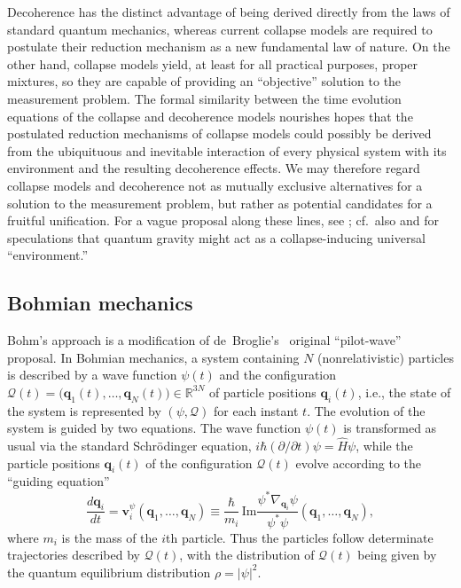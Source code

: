 \documentclass[rmp,aps,amsmath,amsfonts,noshowkeys,noshowpacs,12pt]{revtex4}
\newcommand{\cf}{cf.\ }
\begin{document}
Decoherence has the distinct advantage of being derived directly from
the laws of standard quantum mechanics, whereas current collapse
models are required to postulate their reduction mechanism as a new
fundamental law of nature. On the other hand, collapse models yield,
at least for all practical purposes, proper mixtures, so they are
capable of providing an ``objective'' solution to the measurement
problem. The formal similarity between the time evolution equations of
the collapse and decoherence models nourishes hopes that the
postulated reduction mechanisms of collapse models could possibly be
derived from the ubiquituous and inevitable interaction of every
physical system with its environment and the resulting decoherence
effects. We may therefore regard collapse models and decoherence not
as mutually exclusive alternatives for a solution to the measurement
problem, but rather as potential candidates for a fruitful
unification. For a vague proposal along these lines, see
\citet{Pessoa:1998:yl}; \cf also \citet{Diosi:1989:yb} and
\citet{Pearle:1999:cr} for speculations that quantum gravity might act
as a collapse-inducing universal ``environment.''


\subsection{Bohmian mechanics}

Bohm's approach \citep{Bohm:1952:rc,Bohm:1966:ps,Bohm:1993:ll} is a
modification of de~Broglie's~\citeyearpar{DeBroglie:1930:yt} original
``pilot-wave'' proposal. In Bohmian mechanics, a system containing $N$
(nonrelativistic) particles is described by a wave function $\psi(t)$
and the configuration $\mathcal{Q}(t)=\bigl(\mathbf{q}_1(t), \hdots,
\mathbf{q}_N(t)\bigr) \in \mathbb{R}^{3N}$ of particle positions
$\mathbf{q}_i(t)$, i.e., the state of the system is represented by
$(\psi, \mathcal{Q})$ for each instant $t$. The evolution of the
system is guided by two equations. The wave function $\psi(t)$
is transformed as usual via the standard Schr\"odinger equation, $i
\hbar (\partial / \partial t) \psi = \widehat{H}\psi$, while the
particle positions $\mathbf{q}_i(t)$ of the configuration
$\mathcal{Q}(t)$ evolve according to the ``guiding equation''
%
\begin{equation} \frac{d\mathbf{q}_i}{dt}  =
\mathbf{v}_i^\psi (\mathbf{q}_1, \hdots, \mathbf{q}_N) \equiv
\frac{\hbar}{m_i} \, \mathrm{Im} \frac{\psi^* \nabla_{\mathbf{q}_i}
  \psi}{\psi^*\psi} (\mathbf{q}_1, \hdots, \mathbf{q}_N), 
\end{equation}
%
where $m_i$ is the mass of the $i$th particle. Thus the particles
follow determinate trajectories described by $\mathcal{Q}(t)$, with
the distribution of $\mathcal{Q}(t)$ being given by the quantum
equilibrium distribution $\rho = |\psi|^2$.
\end{document}
